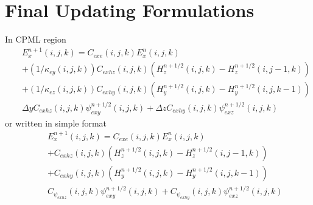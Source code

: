 \documentclass[a4paper,10pt]{article}
\begin{document}
\section{Final Updating Formulations}
In CPML region
\begin{eqnarray}
&&E^{n+1}_x(i,j,k)=C_{exe}(i,j,k)E^n_x(i,j,k)\nonumber\\
&&+(1/\kappa_{ey}(i,j,k))C_{exhz}(i,j,k)\left(H^{n+1/2}_{z}(i,j,k)-H^{n+1/2}_{z}(i,j-1,k)\right)\nonumber\\
&&+(1/\kappa_{ez}(i,j,k))C_{exhy}(i,j,k)\left(H^{n+1/2}_{y}(i,j,k)-H^{n+1/2}_{y}(i,j,k-1)\right)\nonumber\\
&&\Delta y C_{exhz}(i,j,k)\psi^{n+1/2}_{exy}(i,j,k)+\Delta z C_{exhy}(i,j,k)\psi^{n+1/2}_{exz}(i,j,k)
\end{eqnarray}
or written in simple format
\begin{eqnarray}
&&E^{n+1}_x(i,j,k)=C_{exe}(i,j,k)E^n_x(i,j,k)\nonumber\\
&&+C_{exhz}(i,j,k)\left(H^{n+1/2}_{z}(i,j,k)-H^{n+1/2}_{z}(i,j-1,k)\right)\nonumber\\
&&+C_{exhy}(i,j,k)\left(H^{n+1/2}_{y}(i,j,k)-H^{n+1/2}_{y}(i,j,k-1)\right)\nonumber\\
&&C_{\psi_{exhz}}(i,j,k)\psi^{n+1/2}_{exy}(i,j,k)+C_{\psi_{exhy}}(i,j,k)\psi^{n+1/2}_{exz}(i,j,k)
\end{eqnarray}
\end{document}
